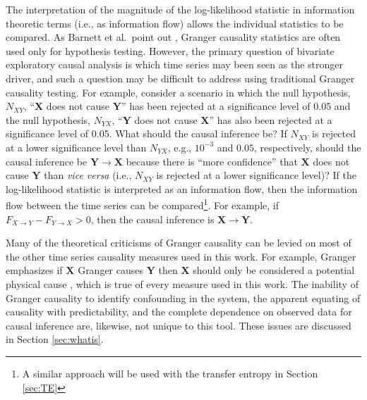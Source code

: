 \documentclass{article}[10pt]
\begin{document}
The interpretation of the magnitude of the log-likelihood statistic in information theoretic terms (i.e., as information flow) allows the individual statistics to be compared.  As Barnett et al.\ point out \cite{Barnett2014}, Granger causality statistics are often used only for hypothesis testing.  However, the primary question of bivariate exploratory causal analysis is which time series may been seen as the stronger driver, and such a question may be difficult to address using traditional Granger causality testing.  For example, consider a scenario in which the null hypothesis, $N_{XY}$, ``$\mathbf{X}$ does not cause $\mathbf{Y}$'' has been rejected at a significance level of 0.05 and the null hypothesis, $N_{YX}$, ``$\mathbf{Y}$ does not cause $\mathbf{X}$'' has also been rejected at a significance level of 0.05.  What should the causal inference be?  If $N_{XY}$ is rejected at a lower significance level than $N_{YX}$, e.g., $10^{-3}$ and $0.05$, respectively, should the causal inference be $\mathbf{Y}\rightarrow\mathbf{X}$ because there is ``more confidence'' that $\mathbf{X}$ does not cause $\mathbf{Y}$ than {\em vice versa} (i.e., $N_{XY}$ is rejected at a lower significance level)?  If the log-likelihood statistic is interpreted as an information flow, then the information flow between the time series can be compared\footnote{A similar approach will be used with the transfer entropy in Section \ref{sec:TE}}.  For example, if $F_{X\rightarrow Y}-F_{Y\rightarrow X}>0$, then the causal inference is $\mathbf{X}\rightarrow\mathbf{Y}$.

Many of the theoretical criticisms of Granger causality can be levied on most of the other time series causality measures used in this work.  For example, Granger emphasizes if $\mathbf{X}$ Granger causes $\mathbf{Y}$ then $\mathbf{X}$ should only be considered a potential physical cause \cite{Granger1963,Berzuini2012}, which is true of every measure used in this work.   The inability of Granger causality to identify confounding in the system, the apparent equating of causality with predictability, and the complete dependence on observed data for causal inference are, likewise, not unique to this tool.  These issues are discussed in Section \ref{sec:whatis}.  
\end{document}
